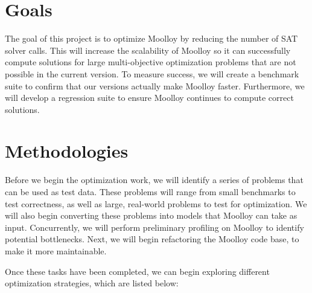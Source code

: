 \documentclass[11pt]{article}
\begin{document}
\section{Goals}\label{sec:goals}
The goal of this project is to optimize Moolloy by reducing the number
of SAT solver calls. This will increase the scalability of Moolloy so
it can successfully compute solutions for large multi-objective
optimization problems that are not possible in the current version.
To measure success, we will create a benchmark suite to confirm that
our versions actually make Moolloy faster. Furthermore, we will develop
a regression suite to ensure Moolloy continues to compute correct
solutions.

\section{Methodologies}\label{sec:methodologies}
Before we begin the optimization work, we will identify a series of
problems that can be used as test data. These problems will range from
small benchmarks to test correctness, as well as large, real-world
problems to test for optimization. We will also begin converting these
problems into models that Moolloy can take as input. Concurrently, we
will perform preliminary profiling on Moolloy to identify potential
bottlenecks. Next, we will begin refactoring the Moolloy code base, to
make it more maintainable.

Once these tasks have been completed, we can begin exploring different
optimization strategies, which are listed below:
\end{document}
